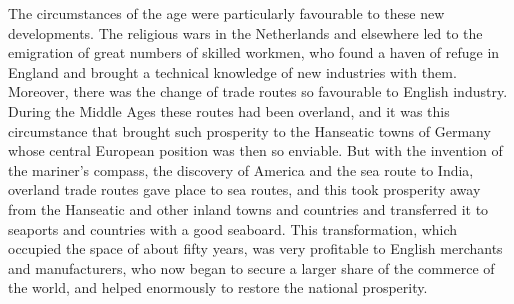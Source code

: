 \documentclass{book}
\begin{document}
The circumstances of the age were particularly favourable to these new developments. The religious wars in the Netherlands and elsewhere led to the emigration of great numbers of skilled workmen, who found a haven of refuge in England and brought a technical knowledge of new industries with them. Moreover, there was the change of trade routes so favourable to English industry. During the Middle Ages these routes had been overland, and it was this circumstance that brought such prosperity to the Hanseatic towns of Germany whose central European position was then so enviable. But with the invention of the mariner’s compass, the discovery of America and the sea route to India, overland trade routes gave place to sea routes, and this took prosperity away from the Hanseatic and other inland towns and countries and transferred it to seaports and countries with a good seaboard. This transformation, which occupied the space of about fifty years, was very profitable to English merchants and manufacturers, who now began to secure a larger share of the commerce of the world, and helped enormously to restore the national prosperity.
\end{document}
